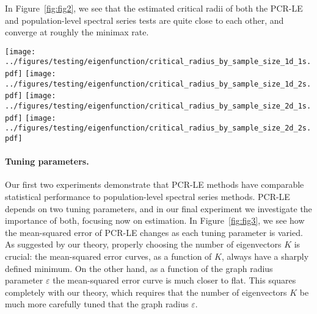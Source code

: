 In Figure~\ref{fig:fig2}, we see that the estimated critical radii of both the PCR-LE and population-level spectral series tests are quite close to each other, and converge at roughly the minimax rate.
\begin{figure*}[b]
	\texttt{[image: ../figures/testing/eigenfunction/critical\_radius\_by\_sample\_size\_1d\_1s.pdf]}
	\texttt{[image: ../figures/testing/eigenfunction/critical\_radius\_by\_sample\_size\_1d\_2s.pdf]}
	\texttt{[image: ../figures/testing/eigenfunction/critical\_radius\_by\_sample\_size\_2d\_1s.pdf]}
	\texttt{[image: ../figures/testing/eigenfunction/critical\_radius\_by\_sample\_size\_2d\_2s.pdf]}
	\caption{Worst-case testing risk for PCR-LE (\texttt{LE}) and spectral series (\texttt{SP}) tests, as a function of sample size $n$. Plots are on the same scale as Figure~\ref{fig:fig1}, and black line shows the minimax rate. All tests are set to have $.05$ Type I error, and are calibrated by simulation under the null.}
	\label{fig:fig2}
\end{figure*}

\paragraph{Tuning parameters.}
Our first two experiments demonstrate that PCR-LE methods have comparable statistical performance to population-level spectral series methods. PCR-LE depends on two tuning parameters, and in our final experiment we investigate the importance of both, focusing now on estimation. In Figure~\ref{fig:fig3}, we see how the mean-squared error of PCR-LE changes as each tuning parameter is varied. As suggested by our theory, properly choosing the number of eigenvectors $K$ is crucial: the mean-squared error curves, as a function of $K$, always have a sharply defined minimum. On the other hand, as a function of the graph radius parameter $\varepsilon$ the mean-squared error curve is much closer to flat. This squares completely with our theory, which requires that the number of eigenvectors $K$ be much more carefully tuned that the graph radius $\varepsilon$.

